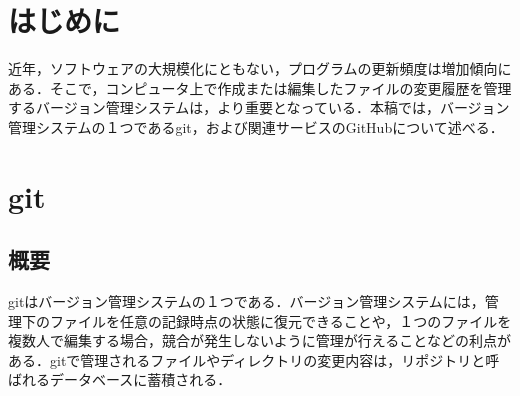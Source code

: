 \documentclass[a4j,9pt,twocolumn]{jsarticle}
\begin{document}


\section{はじめに}
近年，ソフトウェアの大規模化にともない，プログラムの更新頻度は増加傾向にある．そこで，コンピュータ上で作成または編集したファイルの変更履歴を管理するバージョン管理システムは，より重要となっている．本稿では，バージョン管理システムの１つであるgit，および関連サービスのGitHubについて述べる．

\section{git}
\subsection{概要}
gitはバージョン管理システムの１つである．バージョン管理システムには，管理下のファイルを任意の記録時点の状態に復元できることや，１つのファイルを複数人で編集する場合，競合が発生しないように管理が行えることなどの利点がある\cite{pop}．gitで管理されるファイルやディレクトリの変更内容は，リポジトリと呼ばれるデータベースに蓄積される．
\end{document}
